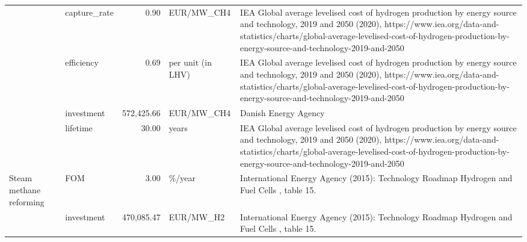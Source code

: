 \begin{longtable}{p{5cm}p{3cm}rp{3cm}p{11cm}}
                      & capture\_rate &           0.90 &                        EUR/MW\_CH4 &                                                                    IEA Global average levelised cost of hydrogen production by energy source and technology, 2019 and 2050 (2020), https://www.iea.org/data-and-statistics/charts/global-average-levelised-cost-of-hydrogen-production-by-energy-source-and-technology-2019-and-2050 \\
                      & efficiency &           0.69 &                 per unit (in LHV) &                                                                    IEA Global average levelised cost of hydrogen production by energy source and technology, 2019 and 2050 (2020), https://www.iea.org/data-and-statistics/charts/global-average-levelised-cost-of-hydrogen-production-by-energy-source-and-technology-2019-and-2050 \\
                      & investment &     572,425.66 &                        EUR/MW\_CH4 &                                                                                                                                                                                                                                                                                                                 Danish Energy Agency \\
                      & lifetime &          30.00 &                             years &                                                                    IEA Global average levelised cost of hydrogen production by energy source and technology, 2019 and 2050 (2020), https://www.iea.org/data-and-statistics/charts/global-average-levelised-cost-of-hydrogen-production-by-energy-source-and-technology-2019-and-2050 \\
Steam methane reforming & FOM &           3.00 &                            \%/year &                                                                                                                                                                                                                                           International Energy Agency (2015): Technology Roadmap Hydrogen and Fuel Cells , table 15. \\
                      & investment &     470,085.47 &                         EUR/MW\_H2 &                                                                                                                                                                                                                                           International Energy Agency (2015): Technology Roadmap Hydrogen and Fuel Cells , table 15. \\

\end{longtable}
